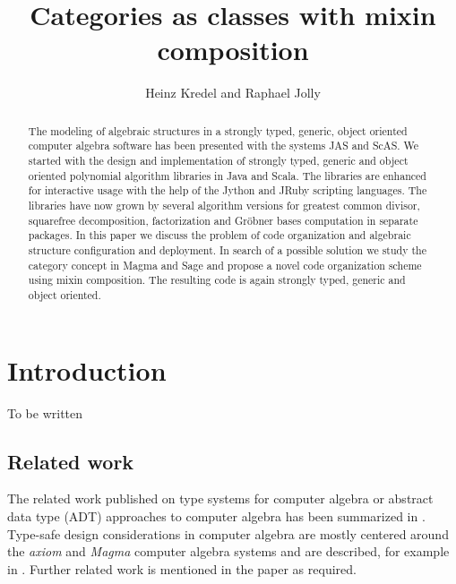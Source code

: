 \documentclass{llncs}
\begin{document}
\title{Categories as classes with mixin composition}

\author{Heinz Kredel and Raphael Jolly} 

\maketitle

\begin{abstract} 
  The modeling of algebraic structures in a strongly typed, generic,
  object oriented computer algebra software has been presented with
  the systems JAS and ScAS. We started with the design and
  implementation of strongly typed, generic and object oriented
  polynomial algorithm libraries in Java and Scala. The libraries are
  enhanced for interactive usage with the help of the Jython and JRuby
  scripting languages. The libraries have now grown by several
  algorithm versions for greatest common divisor, squarefree
  decomposition, factorization and Gr\"obner bases computation in
  separate packages. In this paper we discuss the problem of code
  organization and algebraic structure configuration and deployment.
  In search of a possible solution we study the category concept in
  Magma and Sage and propose a novel code organization scheme using
  mixin composition. The resulting code is again strongly typed,
  generic and object oriented.
\end{abstract}



\section{Introduction} %

To be written

\subsection{Related work} %

The related work published on type systems for computer algebra or
abstract data type (ADT) approaches to computer algebra has been
summarized in \cite{JollyKredel:2010,JollyKredel:2011}.  Type-safe
design considerations in computer algebra are mostly centered around
the {\em axiom} and {\em Magma} computer algebra systems and are
described, for example in
\cite{JenksSutor:1992,Watt:2003,BosmaCannonPlayoust:1997,Stein:2005,SageWiki:2009}.
%
Further related work is mentioned in the paper as required.
\end{document}

